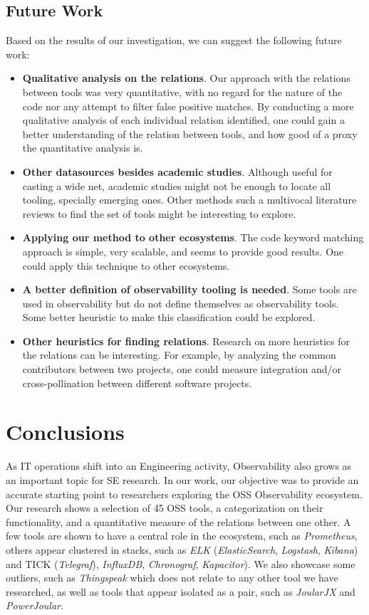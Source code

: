 \documentclass[sigconf]{acmart}
\begin{document}
\subsection{Future Work}\label{future-work}

Based on the results of our investigation, we can suggest the following
future work:

\begin{itemize}
\item
  \textbf{Qualitative analysis on the relations}. Our approach with the
  relations between tools was very quantitative, with no regard for the nature of
  the code nor any attempt to filter false positive matches. By conducting a more
  qualitative analysis of each individual relation identified, one could gain a
  better understanding of the relation between tools, and how good of a proxy the
  quantitative analysis is.
\item
  \textbf{Other datasources besides academic studies}. Although useful
  for casting a wide net, academic studies might not be enough to locate
  all tooling, specially emerging ones. Other methods such a multivocal
  literature reviews to find the set of tools might be interesting to
  explore.
\item
  \textbf{Applying our method to other ecosystems}. The code keyword
  matching approach is simple, very scalable, and seems to provide good
  results. One could apply this technique to other ecosystems.
\item
  \textbf{A better definition of observability tooling is needed}. Some
  tools are used in observability but do not define themselves as
  observability tools. Some better heuristic to make this classification
  could be explored.
\item
  \textbf{Other heuristics for finding relations}. Research on more
  heuristics for the relations can be interesting. For example, by
  analyzing the common contributors between two projects, one could
  measure integration and/or cross-pollination between different
  software projects.
\end{itemize}

\section{Conclusions}\label{conclusions}

As IT operations shift into an Engineering activity, Observability also
grows as an important topic for SE research. In our work, our objective
was to provide an accurate starting point to researchers exploring the
OSS Observability ecosystem. Our research shows a selection of 45 OSS
tools, a categorization on their functionality, and a quantitative
measure of the relations between one other. A few tools are shown to
have a central role in the ecosystem, such as \emph{Prometheus}, others
appear clustered in stacks, such as \emph{ELK} (\emph{ElasticSearch},
\emph{Logstash}, \emph{Kibana}) and TICK (\emph{Telegraf}),
\emph{InfluxDB}, \emph{Chronograf}, \emph{Kapacitor}). We also showcase
some outliers, such as \emph{Thingspeak} which does not relate to any
other tool we have researched, as well as tools that appear isolated as
a pair, such as \emph{JoularJX} and \emph{PowerJoular}.
\end{document}
